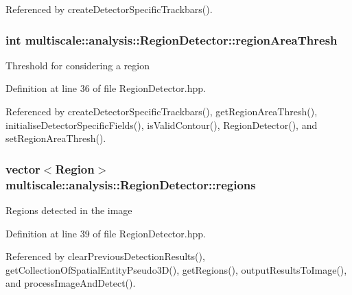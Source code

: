 Referenced by create\-Detector\-Specific\-Trackbars().

\hypertarget{classmultiscale_1_1analysis_1_1RegionDetector_a1f637073a3d946d000dceed01412f19a}{
\subsubsection[{region\-Area\-Thresh}]{\setlength{\rightskip}{0pt plus 5cm}int multiscale\-::analysis\-::\-Region\-Detector\-::region\-Area\-Thresh\hspace{0.3cm}{\ttfamily [private]}}}\label{classmultiscale_1_1analysis_1_1RegionDetector_a1f637073a3d946d000dceed01412f19a}
Threshold for considering a region 

Definition at line 36 of file Region\-Detector.\-hpp.



Referenced by create\-Detector\-Specific\-Trackbars(), get\-Region\-Area\-Thresh(), initialise\-Detector\-Specific\-Fields(), is\-Valid\-Contour(), Region\-Detector(), and set\-Region\-Area\-Thresh().

\hypertarget{classmultiscale_1_1analysis_1_1RegionDetector_aa6517ceb3a58295448d32e6e41499893}{
\subsubsection[{regions}]{\setlength{\rightskip}{0pt plus 5cm}vector$<${\bf Region}$>$ multiscale\-::analysis\-::\-Region\-Detector\-::regions\hspace{0.3cm}{\ttfamily [private]}}}\label{classmultiscale_1_1analysis_1_1RegionDetector_aa6517ceb3a58295448d32e6e41499893}
Regions detected in the image 

Definition at line 39 of file Region\-Detector.\-hpp.



Referenced by clear\-Previous\-Detection\-Results(), get\-Collection\-Of\-Spatial\-Entity\-Pseudo3\-D(), get\-Regions(), output\-Results\-To\-Image(), and process\-Image\-And\-Detect().

